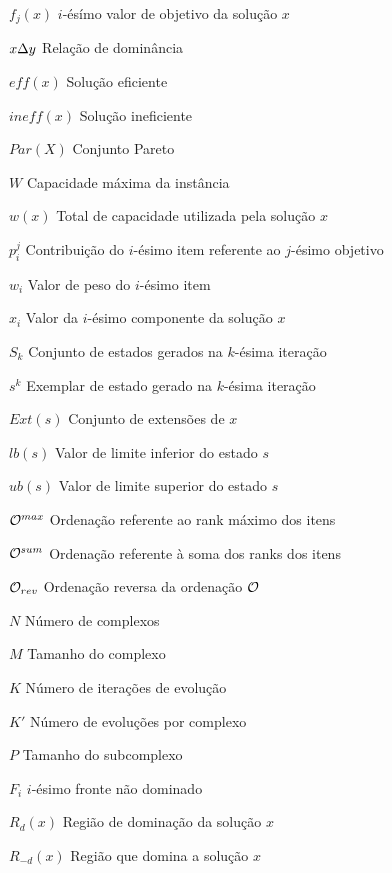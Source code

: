 
\begin{simbolos}
\item[$f_j(x)$] $i$-ésímo valor de objetivo da solução $x$
\item[$x \Delta y$] Relação de dominância
\item[$eff(x)$] Solução eficiente
\item[$ineff(x)$] Solução ineficiente
\item[$Par(X)$] Conjunto Pareto
\item[$W$] Capacidade máxima da instância
\item[$w(x)$] Total de capacidade utilizada pela solução $x$
\item[$p^j_i$] Contribuição do $i$-ésimo item referente ao $j$-ésimo objetivo
\item[$w_i$] Valor de peso do $i$-ésimo item
\item[$x_i$] Valor da $i$-ésimo componente da solução $x$
\item[$S_k$] Conjunto de estados gerados na $k$-ésima iteração
\item[$s^k$] Exemplar de estado gerado na $k$-ésima iteração
\item[$Ext(s) $] Conjunto de extensões de $x$
\item[$lb(s)$] Valor de limite inferior do estado $s$
\item[$ub(s)$] Valor de limite superior do estado $s$
\item[$\mathcal{O}^{max}$] Ordenação referente ao rank máximo dos itens
\item[$\mathcal{O}^{sum}$] Ordenação referente à soma dos ranks dos itens
\item[$\mathcal{O}_{rev}$] Ordenação reversa da ordenação $\mathcal{O}$
\item[$N$] Número de complexos
\item[$M$] Tamanho do complexo
\item[$K$] Número de iterações de evolução
\item[$K'$] Número de evoluções por complexo
\item[$P$] Tamanho do subcomplexo
\item[$F_i$] $i$-ésimo fronte não dominado
\item[$R_d(x)$] Região de dominação da solução $x$
\item[$R_{-d}(x)$] Região que domina a solução $x$
\end{simbolos}
